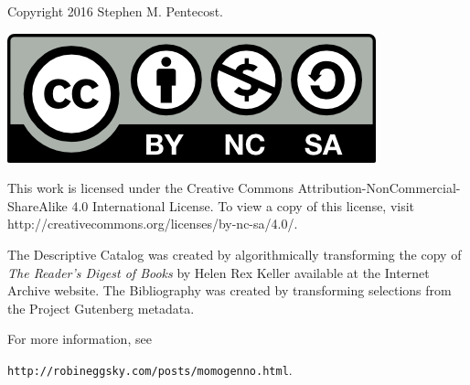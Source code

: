 \newpage
\vspace*{1.0in}
Copyright 2016 Stephen M. Pentecost.
\bigbreak
\bigbreak
\par
\includegraphics[scale=1.0]{by-nc-sa}
\bigbreak
\par
This work is licensed under the Creative Commons Attribution-NonCommercial-ShareAlike 4.0 International License. To view a copy of this license, visit http://creativecommons.org/licenses/by-nc-sa/4.0/.
\bigbreak
\par
The Descriptive Catalog was created by algorithmically transforming the copy of \textit{The Reader's Digest of Books} by Helen Rex Keller available at the Internet Archive website.  The Bibliography was created by transforming selections from the Project Gutenberg metadata.
\bigbreak
\par
For more information, see
\par
\vspace*{0.10in}
\texttt{http://robineggsky.com/posts/momogenno.html}.
\par
